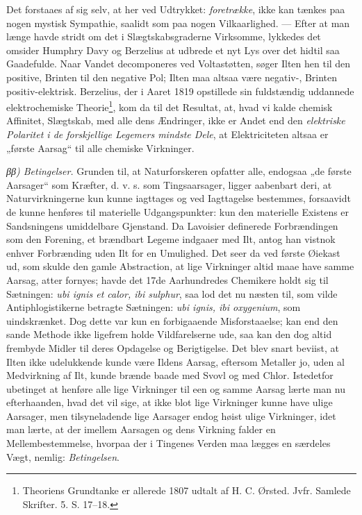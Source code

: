 \documentclass[12pt,a4paper]{book}
\begin{document}
Det forstaaes af sig selv, at her ved Udtrykket:
\emph{foretrække}, ikke kan tænkes paa nogen mystisk Sympathie,
saalidt som paa nogen Vilkaarlighed. --- Efter at man længe havde
stridt om det i Slægtskabsgraderne Virksomme, lykkedes det omsider
Humphry Davy og Berzelius at udbrede et nyt Lys over det hidtil saa
Gaadefulde. Naar Vandet decomponeres ved Voltastøtten, søger Ilten
hen til den positive, Brinten til den negative Pol; Ilten maa
altsaa være negativ-, Brinten positiv-elektrisk. Berzelius, der i
Aaret 1819 opstillede sin fuldstændig uddannede elektrochemiske
Theorie\footnote{Theoriens Grundtanke er allerede 1807 udtalt af
H. C. Ørsted. Jvfr. Samlede Skrifter. 5. S. 17--18.}, kom da til
det Resultat, at, hvad vi kalde chemisk Affinitet, Slægtskab, med
alle dens Ændringer, ikke er Andet end den \emph{elektriske
Polaritet i de forskjellige Legemers mindste Dele}, at
Elektriciteten altsaa er „første Aarsag“ til alle chemiske
Virkninger.

\emph{ββ) Betingelser.} Grunden til, at Naturforskeren opfatter
alle, endogsaa „de første Aarsager“ som Kræfter, d. v. s. som
Tingsaarsager, ligger aabenbart deri, at Naturvirkningerne kun
kunne iagttages og ved Iagttagelse bestemmes, forsaavidt
de kunne henføres til materielle Udgangspunkter: kun den materielle
Existens er Sandsningens umiddelbare Gjenstand. Da Lavoisier
definerede Forbrændingen som den Forening, et brændbart Legeme
indgaaer med Ilt, antog han vistnok enhver Forbrænding uden Ilt for
en Umulighed. Det seer da ved første Øiekast ud, som skulde den
gamle Abstraction, at lige Virkninger altid maae have samme
Aarsag, atter fornyes; havde det 17de Aarhundredes Chemikere holdt
sig til Sætningen: \textit{ubi ignis et calor, ibi sulphur}, saa
lod det nu næsten til, som vilde Antiphlogistikerne betragte
Sætningen: \textit{ubi ignis, ibi oxygenium}, som uindskrænket. Dog
dette var kun en forbigaaende Misforstaaelse; kan end den sande
Methode ikke ligefrem holde Vildfarelserne ude, saa kan den dog
altid frembyde Midler til deres Opdagelse og Berigtigelse. Det blev
snart beviist, at Ilten ikke udelukkende kunde være Ildens Aarsag,
eftersom Metaller jo, uden al Medvirkning af Ilt, kunde brænde
baade med Svovl og med Chlor. Istedetfor ubetinget at henføre alle
lige Virkninger til een og samme Aarsag lærte man nu efterhaanden,
hvad det vil sige, at ikke blot lige Virkninger kunne have ulige
Aarsager, men tilsyneladende lige Aarsager endog høist ulige
Virkninger, idet man lærte, at der imellem Aarsagen og dens
Virkning falder en Mellembestemmelse, hvorpaa der i Tingenes Verden
maa lægges en særdeles Vægt, nemlig: \emph{Betingelsen}.
\end{document}
